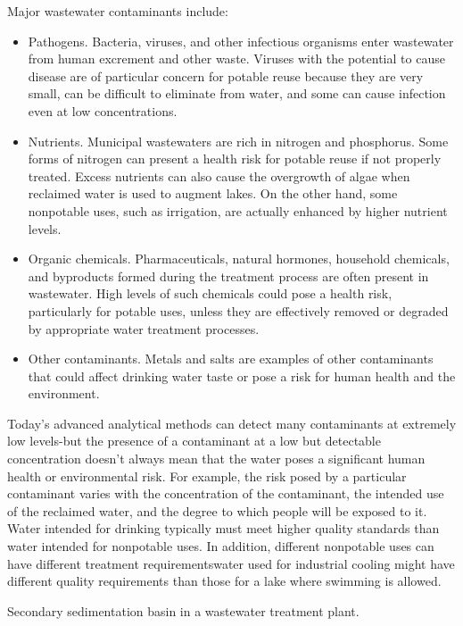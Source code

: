 \documentclass[10pt]{article}
\begin{document}
Major wastewater contaminants include:

\begin{itemize}
  \item Pathogens. Bacteria, viruses, and other infectious organisms enter wastewater from human excrement and other waste. Viruses with the potential to cause disease are of particular concern for potable reuse because they are very small, can be difficult to eliminate from water, and some can cause infection even at low concentrations.

  \item Nutrients. Municipal wastewaters are rich in nitrogen and phosphorus. Some forms of nitrogen can present a health risk for potable reuse if not properly treated. Excess nutrients can also cause the overgrowth of algae when reclaimed water is used to augment lakes. On the other hand, some nonpotable uses, such as irrigation, are actually enhanced by higher nutrient levels.

  \item Organic chemicals. Pharmaceuticals, natural hormones, household chemicals, and byproducts formed during the treatment process are often present in wastewater. High levels of such chemicals could pose a health risk, particularly for potable uses, unless they are effectively removed or degraded by appropriate water treatment processes.

  \item Other contaminants. Metals and salts are examples of other contaminants that could affect drinking water taste or pose a risk for human health and the environment.

\end{itemize}
Today's advanced analytical methods can detect many contaminants at extremely low levels-but the presence of a contaminant at a low but detectable concentration doesn't always mean that the water poses a significant human health or environmental risk. For example, the risk posed by a particular contaminant varies with the concentration of the contaminant, the intended use of the reclaimed water, and the degree to which people will be exposed to it. Water intended for drinking typically must meet higher quality standards than water intended for nonpotable uses. In addition, different nonpotable uses can have different treatment requirementswater used for industrial cooling might have different quality requirements than those for a lake where swimming is allowed.

Secondary sedimentation basin in a wastewater treatment plant.
\end{document}

